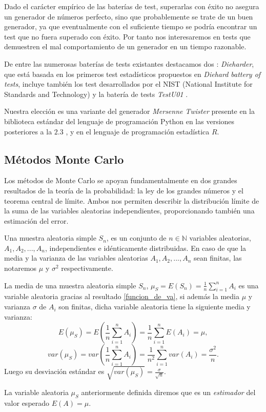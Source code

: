 \documentclass[../proyecto.tex]{memoir}
\begin{document}
Dado el carácter empírico de las baterías de test, superarlas con éxito no asegura un generador de números perfecto, sino que probablemente se trate de un buen generador, ya que eventualmente con el suficiente tiempo se podría encontrar un test que no fuera superado con éxito. Por tanto nos interesaremos en tests que demuestren el mal comportamiento de un generador en un tiempo razonable. 

De entre las numerosas baterías de tests existantes destacamos dos \cite{dieharder,testu01}: \textit{Dieharder}, que está basada en los primeros test estadísticos propuestos en \textit{Diehard battery of tests}, incluye también los test desarrollados por el NIST (National Institute for Standards and Technology) y la batería de tests \textit{TestU01} \cite{dieharder,testu01}.

Nuestra elección es una variante del generador \textit{Mersenne Twister} \cite{mt} presente en la biblioteca estándar del lenguaje de programación Python en las versiones posteriores a la $2.3$ \cite{pyver}, y en el lenguaje de programación estadística $R$\cite{langR}.

\subsection{Métodos Monte Carlo} \label{carlino}

Los métodos de Monte Carlo se apoyan fundamentalmente en dos grandes resultados de la teoría de la probabilidad: la ley de los grandes números y el teorema central de límite. Ambos nos permiten describir la distribución límite de la suma de las variables aleatorias independientes, proporcionando también una estimación del error. 

\begin{defi}
Una muestra aleatoria simple $S_n$, es un conjunto de $n\in\mathds{N}$ variables aleatorias, $A_1,A_2,...,A_n$, independientes e idénticamente distribuidas. En caso de que la media y la varianza de las variables aleatorias $A_1,A_2,...,A_n$ sean finitas, las notaremos $\mu$ y $\sigma^2$ respectivamente.
\end{defi}

La media de una muestra aleatoria simple $S_n$, $\mu_S = E(S_n) = \frac{1}{n}\sum_{i=1}^n A_i$ es una variable aleatoria gracias al resultado \ref{funcion_de_va}, si además la media $\mu$ y varianza $\sigma$ de $A_i$ son finitas, dicha variable aleatoria tiene la siguiente media y varianza:$$
E(\mu_S) = E(\frac{1}{n}\sum_{i=1}^n A_i) = \frac{1}{n}\sum_{i=1}^n E(A_i) = \mu,
$$
$$
var(\mu_S) = var(\frac{1}{n}\sum_{i=1}^n A_i) = \frac{1}{n^2} \sum_{i=1}^n var(A_i) = \frac{\sigma^2}{n}.
$$
Luego su desviación estándar es $\sqrt{var(\mu_S)} = \frac{\sigma}{\sqrt{n}}$.
\begin{defi}
La variable aleatoria $\mu_S$ anteriormente definida diremos que es un \textit{estimador} del valor esperado $E(A)=\mu$.
\end{defi}
\end{document}
